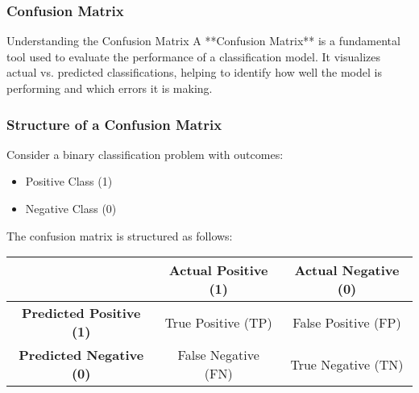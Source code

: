 \documentclass{beamer}
\begin{document}
\begin{frame}[fragile]
    \frametitle{Confusion Matrix}
    \begin{block}{Understanding the Confusion Matrix}
        A **Confusion Matrix** is a fundamental tool used to evaluate the performance of a classification model. It visualizes actual vs. predicted classifications, helping to identify how well the model is performing and which errors it is making.
    \end{block}
\end{frame}

\begin{frame}[fragile]
    \frametitle{Structure of a Confusion Matrix}
    Consider a binary classification problem with outcomes:
    \begin{itemize}
        \item Positive Class (1)
        \item Negative Class (0)
    \end{itemize}
    
    The confusion matrix is structured as follows:

    \begin{center}
    \begin{tabular}{|c|c|c|}
        \hline
        & \textbf{Actual Positive (1)} & \textbf{Actual Negative (0)} \\
        \hline
        \textbf{Predicted Positive (1)} & True Positive (TP) & False Positive (FP) \\
        \hline
        \textbf{Predicted Negative (0)} & False Negative (FN) & True Negative (TN) \\
        \hline
    \end{tabular}
    \end{center}
\end{frame}
\end{document}
